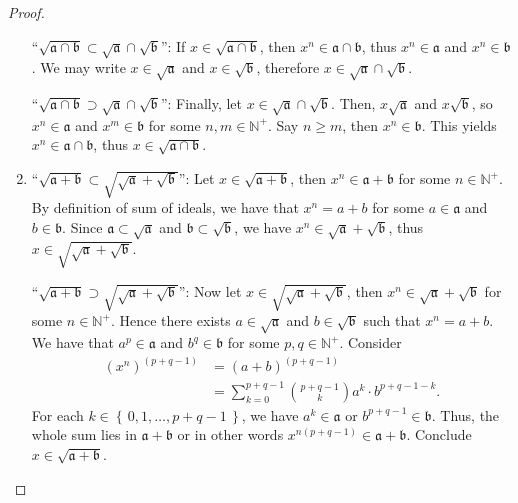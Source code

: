 \documentclass[a4paper]{book}
\theoremstyle{definition}
\newcommand{\set}[1]{\left\{\, #1 \,\right\}}
\begin{document}
\begin{proof}
\begin{enumerate}
        ``\(\sqrt{\mathfrak{a} \cap \mathfrak{b}} \subset \sqrt{\mathfrak{a}} \cap \sqrt{\mathfrak{b}}\)'': If \(x \in \sqrt{\mathfrak{a} \cap \mathfrak{b}}\), then \(x^n \in \mathfrak{a} \cap \mathfrak{b}\), thus \(x^n \in \mathfrak{a}\) and \(x^n \in \mathfrak{b}\). We may write \(x \in \sqrt{\mathfrak{a}}\) and \(x \in \sqrt{\mathfrak{b}}\), therefore \(x \in \sqrt{\mathfrak{a}} \cap \sqrt{\mathfrak{b}}\).

        ``\(\sqrt{\mathfrak{a} \cap \mathfrak{b}} \supset \sqrt{\mathfrak{a}} \cap \sqrt{\mathfrak{b}}\)'': Finally, let \(x \in \sqrt{\mathfrak{a}} \cap \sqrt{\mathfrak{b}}\). Then, \(x \sqrt{\mathfrak{a}}\) and \(x \sqrt{\mathfrak{b}}\), so \(x^n \in \mathfrak{a}\) and \(x^m \in \mathfrak{b}\) for some \(n, m \in \mathbb{N}^+\). Say \(n \geq m\), then \(x^n \in \mathfrak{b}\). This yields \(x^n \in \mathfrak{a} \cap \mathfrak{b}\), thus \(x \in \sqrt{\mathfrak{a} \cap \mathfrak{b}}\).



        \item ``\(\sqrt{\mathfrak{a} + \mathfrak{b}} \subset \sqrt{\sqrt{\mathfrak{a}} + \sqrt{\mathfrak{b}}}\)'': Let \(x \in \sqrt{\mathfrak{a} + \mathfrak{b}}\), then \(x^n \in \mathfrak{a} + \mathfrak{b}\) for some \(n \in \mathbb{N}^+\). By definition of sum of ideals, we have that \(x^n = a + b\) for some \(a \in \mathfrak{a}\) and \(b \in \mathfrak{b}\). Since \(\mathfrak{a} \subset \sqrt{\mathfrak{a}}\) and \(\mathfrak{b} \subset \sqrt{\mathfrak{b}}\), we have \(x^n \in \sqrt{\mathfrak{a}} + \sqrt{\mathfrak{b}}\), thus \(x \in \sqrt{\sqrt{\mathfrak{a}} + \sqrt{\mathfrak{b}}}\).
        
        ``\(\sqrt{\mathfrak{a} + \mathfrak{b}} \supset \sqrt{\sqrt{\mathfrak{a}} + \sqrt{\mathfrak{b}}}\)'': Now let \(x \in \sqrt{\sqrt{\mathfrak{a}} + \sqrt{\mathfrak{b}}}\), then \(x^n \in \sqrt{\mathfrak{a}} + \sqrt{\mathfrak{b}}\) for some \(n \in \mathbb{N}^+\). Hence there exists \(a \in \sqrt{\mathfrak{a}}\) and \(b \in \sqrt{\mathfrak{b}}\) such that \(x^n = a + b\). We have that \(a^p \in \mathfrak{a}\) and \(b^q \in \mathfrak{b}\) for some \(p, q \in \mathbb{N}^+\). Consider
        \begin{align*}
            \left(x^n\right)^{(p + q -1)} &= (a + b)^{(p + q -1)} \\ 
            &= \sum_{k=0}^{p + q - 1} \binom{p + q - 1}{k} a^k \cdot b^{p + q - 1 - k} \text{.}
        \end{align*}
        For each \(k \in \set{0, 1, \ldots, p + q -1}\), we have \(a^k \in \mathfrak{a}\) or \(b^{p + q - 1} \in \mathfrak{b}\). Thus, the whole sum lies in \(\mathfrak{a} + \mathfrak{b}\) or in other words \(x^{n(p + q - 1)} \in \mathfrak{a} + \mathfrak{b}\). Conclude \(x \in \sqrt{\mathfrak{a} + \mathfrak{b}}\).




\end{enumerate}
\end{proof}
\end{document}
